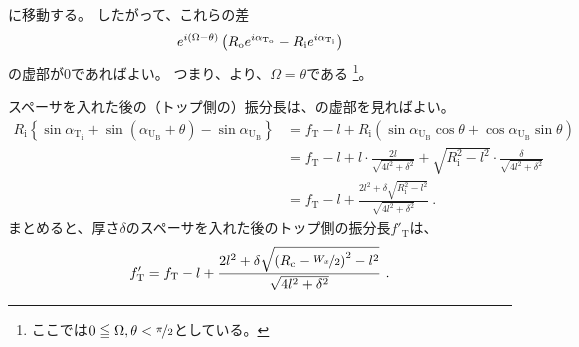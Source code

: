 に移動する。
したがって、これらの差
\begin{align*}
  \notag
  e^{i(\Omega - \theta)}\left(R_\mathrm oe^{i\alpha_{\mathrm T_\mathrm o}} - R_\mathrm ie^{i\alpha_{\mathrm T_\mathrm i}}\right)
\end{align*}
の虚部が$0$であればよい。
つまり、より、$\Omega = \theta$である
\footnote{ここでは$0 \leqq \Omega, \theta < \nicefrac \pi2$としている。}。

スペーサを入れた後の（トップ側の）振分長は、の虚部を見ればよい。
\begin{align*}
  R_\mathrm i\left\{\sin\alpha_{\mathrm T_\mathrm i} + \sin(\alpha_{\mathrm U_\mathrm B} + \theta) - \sin\alpha_{\mathrm U_\mathrm B}\right\}
  &= f_\mathrm T -l
     +R_\mathrm i\left(\sin\alpha_{\mathrm U_\mathrm B}\cos\theta + \cos\alpha_{\mathrm U_\mathrm B}\sin\theta\right)\\
  &= f_\mathrm T -l+l\cdot\frac{2l}{\sqrt{4l^2+\delta^2}}
     +\sqrt{R_\mathrm i^2-l^2}\cdot\frac{\delta}{\sqrt{4l^2+\delta^2}}\\
  &= f_\mathrm T -l+\frac{2l^2+\delta\sqrt{R_\mathrm i^2-l^2}}{\sqrt{4l^2+\delta^2}}~.
\end{align*}
まとめると、厚さ$\delta$のスペーサを入れた後のトップ側の振分長$f'_\mathrm T$は、
\begin{align*}
  f'_\mathrm T
  = f_\mathrm T -l
    +\frac{2l^2+\delta\sqrt{\left(R_\mathrm c-\nicefrac{W_x}2\right)^2-l^2}}{\sqrt{4l^2+\delta^2}}~.
\end{align*}



